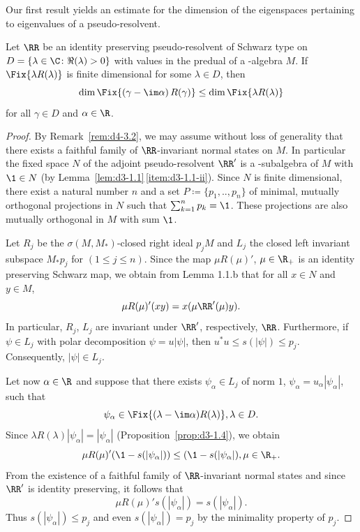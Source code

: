 Our first result yields an estimate for the dimension of the eigenspaces pertaining to eigenvalues of a pseudo-resolvent.
\begin{proposition}\label{prop:d3-2.1}
Let $\RR$ be an identity preserving pseudo-resolvent of Schwarz type on $D = \{\lambda \in \C \colon \Re(\lambda) > 0\}$ with values in the predual of a \WA-algebra $M$. 
If\/ $\Fix{\lambda R(\lambda)}$ is finite dimensional for some $\lambda \in D$, then
\[
\dim \Fix{\left( \gamma - \im\alpha \right)R(\gamma)} \leq \dim \Fix{\lambda R(\lambda)}
\]
for all $\gamma \in D$ and $\alpha \in \R$.
\end{proposition}
\begin{proof}
By Remark~\ref{rem:d4-3.2}, we may assume without loss of generality that there exists a faithful family of\/ $\RR$-invariant normal states on $M$.
In particular the fixed space $N$ of the adjoint pseudo-resolvent $\RR'$ is a \WA-subalgebra of\/ $M$ with $\1 \in N$ (by Lemma~\ref{lem:d3-1.1}\,\ref{item:d3-1.1-ii}).
Since $N$ is finite dimensional, there exist a natural number $n$ and a set $P \coloneqq \{p_{1}, .., p_{n}\}$ of minimal, mutually orthogonal projections in $N$ such that $\sum_{k=1}^{n} p_{k} = \1$.
These projections are also mutually orthogonal in $M$ with sum $\1$.

Let $R_{j}$ be the $\sigma(M,M_{*})$-closed right ideal $p_{j}M$ and $L_{j}$ the closed left invariant subspace $M_{*}p_{j}$ for $(1 \leq j \leq n)$.
Since the map $\mu R(\mu)'$, $\mu \in \R_{+}$ is an identity preserving Schwarz map, we obtain from Lemma 1.1.b that for all $x \in N$ and $y \in M$,
\[
	\mu R(\mu)'(xy) = x(\mu \RR'(\mu)y) .
\]
In particular, $R_{j}$, \resp $L_{j}$ are invariant under $\RR'$, respectively, $\RR$.
Furthermore, if\/ $\psi \in L_{j}$ with polar decomposition $\psi = u|\psi|$, then $u^{*}u \leq s(|\psi|) \leq p_{j}$.
Consequently, $|\psi| \in L_{j}$.

Let now $\alpha \in \R$ and suppose that there exists $\psi_{\alpha} \in L_{j}$ of norm $ 1 $, $\psi_{\alpha} = u_{\alpha}|\psi_{\alpha}|$, such that
\[
	\psi_{\alpha} \in \Fix  {(\lambda - \im\alpha)R(\lambda)} , \lambda \in D .
\]
Since $\lambda R(\lambda)|\psi_{\alpha}| = |\psi_{\alpha}|$ (Proposition~\ref{prop:d3-1.4}), we obtain
\[
	\mu R(\mu)'(\1-s(|\psi_{\alpha}|)) \leq (\1-s(|\psi_{\alpha}|) , \mu \in \R_{+} .
\]
From the existence of a faithful family of\/ $\RR$-invariant normal states and since $\RR'$ is identity preserving, it follows that
\[
	\mu R(\mu)'s(|\psi_{\alpha}|) = s(|\psi_{\alpha}|) .
\]
Thus $s(|\psi_{\alpha}|) \leq p_{j}$ and even $s(|\psi_{\alpha}|) = p_{j}$ by the minimality property of\/ $p_{j}$.


\end{proof}
